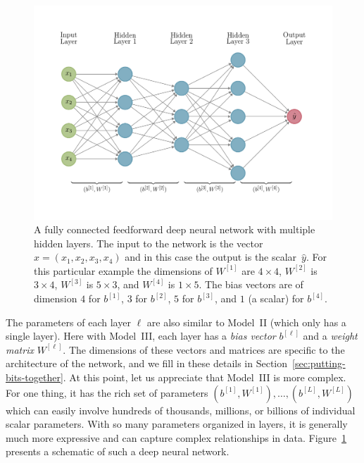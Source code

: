 \documentclass[12pt]{article}
\begin{document}
\begin{figure}[h!] 
\begin{center}
\includegraphics[scale=0.7,trim=0 40 0 50, clip]{figures/deep_neural_network1.pdf}
 \caption{A fully connected feedforward deep neural network with multiple hidden layers. The input to the network is the vector $x = (x_1, x_2, x_3, x_4)$ and in this case the output is the scalar~$\hat{y}$. For this particular example the dimensions of $W^{[1]}$ are $4\times 4$, $W^{[2]}$ is $3 \times 4$, $W^{[3]}$ is $5 \times 3$, and $W^{[4]}$ is $1 \times 5$. The bias vectors are of dimension $4$ for $b^{[1]}$, $3$ for $b^{[2]}$, $5$ for $b^{[3]}$, and $1$ (a scalar) for $b^{[4]}$.
 }
    \label{FFNN}
\end{center}
\end{figure}

The parameters of each layer $\ell$ are also similar to Model~II (which only has a single layer). Here with Model~III, each layer has a {\em bias vector} $b^{[\ell]}$ and a {\em weight matrix} $W^{[\ell]}$. The dimensions of these vectors and matrices are specific to the architecture of the network, and we fill in these details in Section~\ref{sec:putting-bits-together}. At this point, let us appreciate that Model~III is more complex. For one thing, it has the rich set of parameters $(b^{[1]}, W^{[1]}), \ldots, (b^{[L]}, W^{[L]})$ which can easily involve hundreds of thousands, millions, or billions of individual scalar parameters.  With so many parameters organized in layers, it is generally much more expressive and can capture complex relationships in data. Figure~\ref{FFNN} presents a schematic of such a deep neural network.
\end{document}
